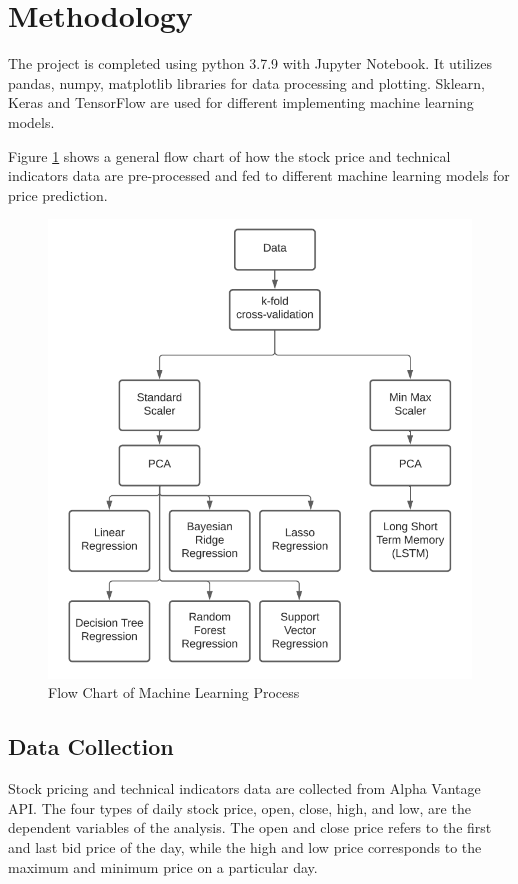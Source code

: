 \documentclass[conference]{IEEEtran}
\begin{document}
\section{Methodology}
The project is completed using python 3.7.9 with Jupyter Notebook. It utilizes pandas, numpy, matplotlib libraries for data processing and plotting. Sklearn, Keras and TensorFlow are used for different implementing machine learning models. 

Figure \ref{figure:flow_chart1} shows a general flow chart of how the stock price and technical indicators data are pre-processed and fed to different machine learning models for price prediction.

\begin{figure}
  \includegraphics[width=\linewidth]{./image/flow_chart.PNG}
  \caption{Flow Chart of Machine Learning Process}
  \label{figure:flow_chart1}
\end{figure}

\subsection{Data Collection}\label{AA}
Stock pricing and technical indicators data are collected from Alpha Vantage API. The four types of daily stock price, open, close, high, and low, are the dependent variables of the analysis. The open and close price refers to the first and last bid price of the day, while the high and low price corresponds to the maximum and minimum price on a particular day. 
\end{document}
